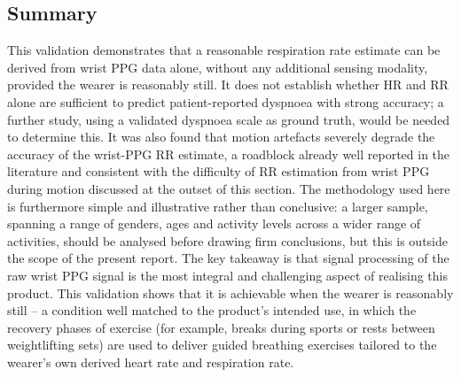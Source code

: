 \subsection{Summary}

This validation demonstrates that a reasonable respiration rate estimate can be derived from wrist PPG data alone, without any additional sensing modality, provided the wearer is reasonably still. It does not establish whether HR and RR alone are sufficient to predict patient-reported dyspnoea with strong accuracy; a further study, using a validated dyspnoea scale as ground truth, would be needed to determine this. It was also found that motion artefacts severely degrade the accuracy of the wrist-PPG RR estimate, a roadblock already well reported in the literature and consistent with the difficulty of RR estimation from wrist PPG during motion discussed at the outset of this section. The methodology used here is furthermore simple and illustrative rather than conclusive: a larger sample, spanning a range of genders, ages and activity levels across a wider range of activities, should be analysed before drawing firm conclusions, but this is outside the scope of the present report. The key takeaway is that signal processing of the raw wrist PPG signal is the most integral and challenging aspect of realising this product. This validation shows that it is achievable when the wearer is reasonably still -- a condition well matched to the product's intended use, in which the recovery phases of exercise (for example, breaks during sports or rests between weightlifting sets) are used to deliver guided breathing exercises tailored to the wearer's own derived heart rate and respiration rate.
